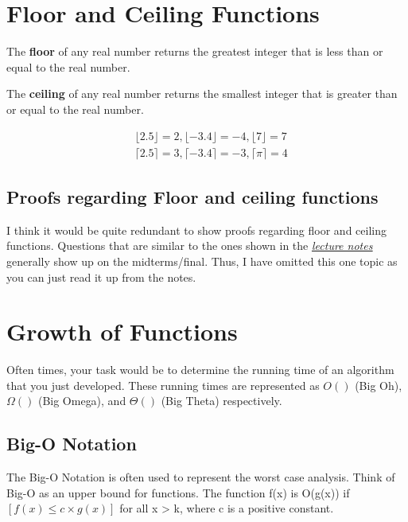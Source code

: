 \section{Floor and Ceiling Functions}
\begin{definition}
    The \textbf{floor} of any real number returns the greatest integer that is
    less than or equal to the real number.
\end{definition}

\begin{definition}
    The \textbf{ceiling} of any real number returns the smallest integer that
    is greater than or equal to the real number.
\end{definition}

\begin{example}
    \[
        \begin{split}
            &\lfloor 2.5 \rfloor = 2, \lfloor -3.4 \rfloor = -4, \lfloor 7
            \rfloor = 7 \\
            &\lceil 2.5 \rceil = 3, \lceil -3.4 \rceil = -3, \lceil \pi \rceil
            = 4
        \end{split}
    \]
\end{example}

\subsection{Proofs regarding Floor and ceiling functions}
I think it would be quite redundant to show proofs regarding floor and ceiling
functions. Questions that are similar to the ones shown in the
\href{http://nook.cs.ucdavis.edu/~koehl/Teaching/ECS20/Lectures/Lecture5_notes.pdf}{\underline{\emph{lecture
notes}}} generally show up on the midterms/final. Thus, I have omitted this one
topic as you can just read it up from the notes.

\section{Growth of Functions}
Often times, your task would be to determine the running time of an algorithm
that you just developed. These running times are represented as $O()$ (Big Oh),
$\Omega()$ (Big Omega), and $\Theta()$ (Big Theta) respectively.

\subsection{Big-O Notation}
The Big-O Notation is often used to represent the worst case analysis. Think of
Big-O as an upper bound for functions. The function f(x) is O(g(x)) if $[f(x)
\leq c \times g(x)]$ for all x > k, where c is a positive constant.

